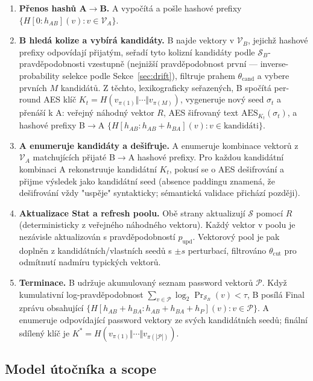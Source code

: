 \documentclass[11pt,a4paper]{article}
\begin{document}
\begin{enumerate}[leftmargin=*]
\item \textbf{Přenos hashů A$\to$B.} A vypočítá a pošle hashové prefixy $\{H[0{:}h_{AB}](v) : v \in \mathcal{V}_A\}$.

\item \textbf{B hledá kolize a vybírá kandidáty.} B najde vektory v $\mathcal{V}_B$, jejichž hashové prefixy odpovídají přijatým, seřadí tyto kolizní kandidáty podle $\mathcal{S}_B$-pravděpodobnosti vzestupně (nejnižší pravděpodobnost první --- inverse-probability selekce podle Sekce~\ref{sec:drift}), filtruje prahem $\theta_{\text{cand}}$ a vybere prvních $M$ kandidátů. Z těchto, lexikograficky seřazených, B spočítá per-round AES klíč $K_t = H(v_{\pi(1)} \Vert \cdots \Vert v_{\pi(M)})$, vygeneruje nový seed $\sigma_t$ a přenáší k A: veřejný náhodný vektor $R$, AES šifrovaný text $\mathrm{AES}_{K_t}(\sigma_t)$, a hashové prefixy B$\to$A $\{H[h_{AB}{:}h_{AB}+h_{BA}](v) : v \in \text{kandidáti}\}$.

\item \textbf{A enumeruje kandidáty a dešifruje.} A enumeruje kombinace vektorů z $\mathcal{V}_A$ matchujících přijaté B$\to$A hashové prefixy. Pro každou kandidátní kombinaci A rekonstruuje kandidátní $K_t$, pokusí se o AES dešifrování a přijme výsledek jako kandidátní seed (absence paddingu znamená, že dešifrování vždy "uspěje" syntakticky; sémantická validace přichází později).

\item \textbf{Aktualizace Stat a refresh poolu.} Obě strany aktualizují $\mathcal{S}$ pomocí $R$ (deterministicky z veřejného náhodného vektoru). Každý vektor v poolu je nezávisle aktualizován s pravděpodobností $p_\text{upd}$. Vektorový pool je pak doplněn z kandidátních/vlastních seedů s $\pm s$ perturbací, filtrováno $\theta_{\text{cut}}$ pro odmítnutí nadmíru typických vektorů.

\item \textbf{Terminace.} B udržuje akumulovaný seznam password vektorů $\mathcal{P}$. Když kumulativní log-pravděpodobnost $\sum_{v \in \mathcal{P}} \log_2 \Pr_{\mathcal{S}_B}(v) < \tau$, B posílá Final zprávu obsahující $\{H[h_{AB}+h_{BA}{:}h_{AB}+h_{BA}+h_P](v) : v \in \mathcal{P}\}$. A enumeruje odpovídající password vektory ze svých kandidátních seedů; finální sdílený klíč je $K^* = H(v_{\pi(1)} \Vert \cdots \Vert v_{\pi(|\mathcal{P}|)})$.
\end{enumerate}

\subsection{Model útočníka a scope}
\end{document}
